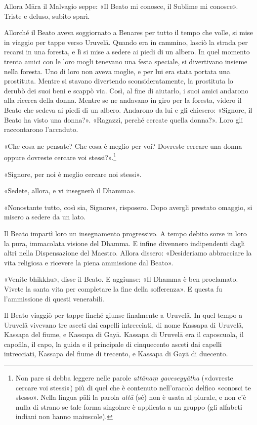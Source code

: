 Allora Māra il Malvagio seppe: «Il Beato mi conosce, il Sublime mi
conosce». Triste e deluso, subito sparì.


Allorché il Beato aveva soggiornato a Benares per tutto il tempo che
volle, si mise in viaggio per tappe verso Uruvelā. Quando era in
cammino, lasciò la strada per recarsi in una foresta, e lì si mise a
sedere ai piedi di un albero. In quel momento trenta amici con le loro
mogli tenevano una festa speciale, si divertivano insieme nella foresta.
Uno di loro non aveva moglie, e per lui era stata portata una
prostituta. Mentre si stavano divertendo sconsideratamente, la
prostituta lo derubò dei suoi beni e scappò via. Così, al fine di
aiutarlo, i suoi amici andarono alla ricerca della donna. Mentre se ne
andavano in giro per la foresta, videro il Beato che sedeva ai piedi di
un albero. Andarono da lui e gli chiesero: «Signore, il Beato ha visto
una donna?». «Ragazzi, perché cercate quella donna?». Loro gli
raccontarono l’accaduto.


«Che cosa ne pensate? Che cosa è meglio per voi? Dovreste cercare una
donna oppure dovreste cercare voi stessi?».\footnote{Non pare si debba leggere nelle parole \emph{attānaṃ gaveseyyātha} («dovreste cercare voi stessi») più di quel che è contenuto nell’oracolo delfico «conosci te stesso». Nella lingua pāli la parola \emph{attā} (sé) non è usata al plurale, e non c’è nulla di strano se tale forma singolare è applicata a un gruppo (gli alfabeti indiani non hanno maiuscole).}


«Signore, per noi è meglio cercare noi stessi».


«Sedete, allora, e vi insegnerò il Dhamma».


«Nonostante tutto, così sia, Signore», risposero. Dopo avergli prestato
omaggio, si misero a sedere da un lato.


Il Beato impartì loro un insegnamento progressivo. A tempo debito sorse
in loro la pura, immacolata visione del Dhamma. E infine divennero
indipendenti dagli altri nella Dispensazione del Maestro. Allora
dissero: «Desideriamo abbracciare la vita religiosa e ricevere la piena
ammissione dal Beato».


«Venite bhikkhu», disse il Beato. E aggiunse: «Il Dhamma è ben
proclamato. Vivete la santa vita per completare la fine della
sofferenza». E questa fu l’ammissione di questi venerabili.


Il Beato viaggiò per tappe finché giunse finalmente a Uruvelā. In quel
tempo a Uruvelā vivevano tre asceti dai capelli intrecciati, di nome
Kassapa di Uruvelā, Kassapa del fiume, e Kassapa di Gayā. Kassapa di
Uruvelā era il caposcuola, il capofila, il capo, la guida e il
principale di cinquecento asceti dai capelli intrecciati, Kassapa del
fiume di trecento, e Kassapa di Gayā di duecento.


